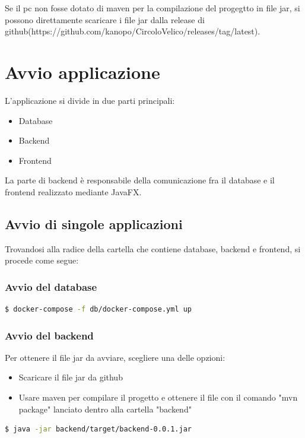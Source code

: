 \documentclass{report}
\begin{document}
    Se il pc non fosse dotato di maven per la compilazione del progegtto in file jar, si possono direttamente scaricare i file jar dalla release di github(https://github.com/kanopo/CircoloVelico/releases/tag/latest).

    \section{Avvio applicazione}
    L'applicazione si divide in due parti principali:
  \begin{itemize}
    \item Database
    \item Backend
    \item Frontend
  \end{itemize}

  La parte di backend è responsabile della comunicazione fra il database e il frontend realizzato mediante JavaFX. 

  \subsection{Avvio di singole applicazioni}
  Trovandosi alla radice della cartella che contiene database, backend e frontend, si procede come segue:
  \subsubsection{Avvio del database}

  \begin{lstlisting}[language=bash]
  $ docker-compose -f db/docker-compose.yml up
  \end{lstlisting}    

  \subsubsection{Avvio del backend}
  Per ottenere il file jar da avviare, scegliere una delle opzioni:
  \begin{itemize}
    \item Scaricare il file jar da github
    \item Usare maven per compilare il progetto e ottenere il file con il comando "mvn package" lanciato dentro alla cartella "backend"
  \end{itemize}

  \begin{lstlisting}[language=bash]
  $ java -jar backend/target/backend-0.0.1.jar
  \end{lstlisting}  
\end{document}
